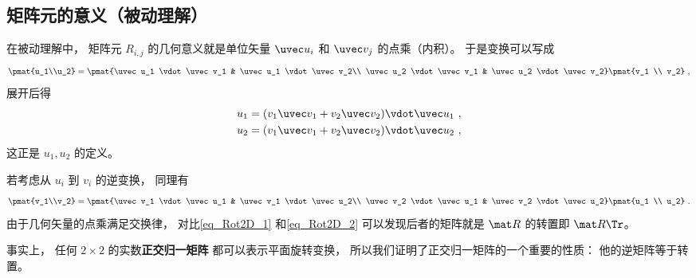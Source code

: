 \subsection{矩阵元的意义（被动理解）}
在被动理解中， 矩阵元 $R_{i,j}$ 的几何意义就是单位矢量 $\uvec u_i$ 和 $\uvec v_j$ 的点乘（内积）。 于是变换可以写成
\begin{equation}\label{eq_Rot2D_1}
\pmat{u_1\\u_2} = \pmat{\uvec u_1 \vdot \uvec v_1 & \uvec u_1 \vdot \uvec v_2\\ \uvec u_2 \vdot \uvec v_1 & \uvec u_2 \vdot \uvec v_2} \pmat{v_1 \\ v_2}~,
\end{equation}
展开后得
\begin{equation}
\begin{aligned}
&u_1 = (v_1 \uvec v_1 + v_2 \uvec v_2) \vdot \uvec u_1~,\\
&u_2 = (v_1 \uvec v_1 + v_2 \uvec v_2) \vdot \uvec u_2~,
\end{aligned}
\end{equation}
这正是 $u_1, u_2$ 的定义。

若考虑从 $u_i$ 到 $v_i$ 的逆变换， 同理有
\begin{equation}\label{eq_Rot2D_2}
\pmat{v_1\\v_2} = \pmat{\uvec v_1 \vdot \uvec u_1 & \uvec v_1 \vdot \uvec u_2\\ \uvec v_2 \vdot \uvec u_1 & \uvec v_2 \vdot \uvec u_2} \pmat{u_1 \\ u_2}~.
\end{equation}
由于几何矢量的点乘满足交换律， 对比\autoref{eq_Rot2D_1} 和\autoref{eq_Rot2D_2} 可以发现后者的矩阵就是 $\mat R$ 的转置即 $\mat R\Tr$。

事实上， 任何 $2\times2$ 的实数\textbf{正交归一矩阵} 都可以表示平面旋转变换， 所以我们证明了正交归一矩阵的一个重要的性质： 他的逆矩阵等于转置。
